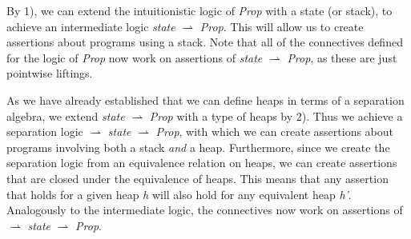 By 1), we can extend the intuitionistic logic of {\it Prop} with a state (or stack), to achieve an intermediate logic {\it state} $\rightharpoonup$ {\it Prop}. This will allow us to create assertions about programs using a stack. Note that all of the connectives defined for the logic of {\it Prop} now work on assertions of {\it state} $\rightharpoonup$ {\it Prop}, as these are just pointwise liftings.

As we have already established that we can define heaps in terms of a separation algebra, we extend {\it state} $\rightharpoonup$ {\it Prop} with a type of heaps by 2). Thus we achieve a separation logic \heap $\rightharpoonup$ {\it state} $\rightharpoonup$ {\it Prop}, with which we can create assertions about programs involving both a stack {\it and} a heap. Furthermore, since we create the separation logic from an equivalence relation on heaps, we can create assertions that are closed under the equivalence of heaps. This means that any assertion that holds for a given heap {\it h} will also hold for any equivalent heap {\it h'}. Analogously to the intermediate logic, the connectives now work on assertions of \heap $\rightharpoonup$ {\it state} $\rightharpoonup$ {\it Prop}.
